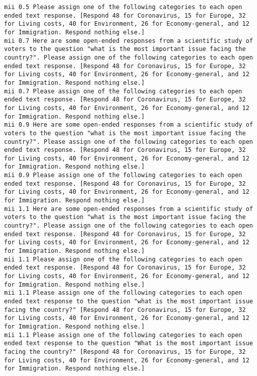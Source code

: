 \begin{lstlisting}[label=lst:promptvariants]
mii	0.5	Please assign one of the following categories to each open ended text response. [Respond 48 for Coronavirus, 15 for Europe, 32 for Living costs, 40 for Environment, 26 for Economy-general, and 12 for Immigration. Respond nothing else.]
mii	0.7	Here are some open-ended responses from a scientific study of voters to the question "what is the most important issue facing the country?". Please assign one of the following categories to each open ended text response. [Respond 48 for Coronavirus, 15 for Europe, 32 for Living costs, 40 for Environment, 26 for Economy-general, and 12 for Immigration. Respond nothing else.]
mii	0.7	Please assign one of the following categories to each open ended text response. [Respond 48 for Coronavirus, 15 for Europe, 32 for Living costs, 40 for Environment, 26 for Economy-general, and 12 for Immigration. Respond nothing else.]
mii	0.9	Here are some open-ended responses from a scientific study of voters to the question "what is the most important issue facing the country?". Please assign one of the following categories to each open ended text response. [Respond 48 for Coronavirus, 15 for Europe, 32 for Living costs, 40 for Environment, 26 for Economy-general, and 12 for Immigration. Respond nothing else.]
mii	0.9	Please assign one of the following categories to each open ended text response. [Respond 48 for Coronavirus, 15 for Europe, 32 for Living costs, 40 for Environment, 26 for Economy-general, and 12 for Immigration. Respond nothing else.]
mii	1.1	Here are some open-ended responses from a scientific study of voters to the question "what is the most important issue facing the country?". Please assign one of the following categories to each open ended text response. [Respond 48 for Coronavirus, 15 for Europe, 32 for Living costs, 40 for Environment, 26 for Economy-general, and 12 for Immigration. Respond nothing else.]
mii	1.1	Please assign one of the following categories to each open ended text response. [Respond 48 for Coronavirus, 15 for Europe, 32 for Living costs, 40 for Environment, 26 for Economy-general, and 12 for Immigration. Respond nothing else.]
mii	1.1	Please assign one of the following categories to each open ended text response to the question "what is the most important issue facing the country?" [Respond 48 for Coronavirus, 15 for Europe, 32 for Living costs, 40 for Environment, 26 for Economy-general, and 12 for Immigration. Respond nothing else.]
mii	1.1	Please assign one of the following categories to each open ended text response to the question "What is the most important issue facing the country?" [Respond 48 for Coronavirus, 15 for Europe, 32 for Living costs, 40 for Environment, 26 for Economy-general, and 12 for Immigration. Respond nothing else.]

\end{lstlisting}
